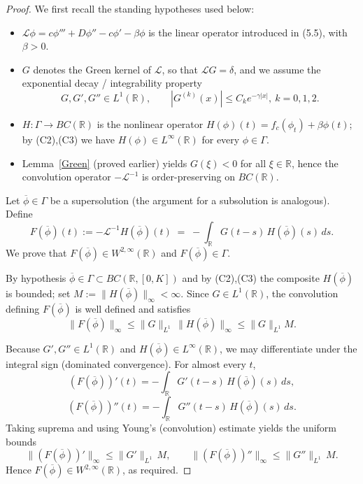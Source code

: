 \documentclass[12pt,letterpaper]{amsart}
\theoremstyle{definition}
\theoremstyle{remark}
\numberwithin{equation}{section}
\begin{document}
 \begin{proof}
 	We first recall the standing hypotheses used below:
 	\begin{itemize}
 		\item $\mathcal L\phi=c\phi''' + D\phi'' - c\phi' -\beta\phi$ is the linear operator introduced in (5.5), with $\beta>0$.
 		\item $G$ denotes the Green kernel of $\mathcal L$, so that $\mathcal L G=\delta$, and we assume the exponential decay / integrability property
 		$$G,G',G''\in L^1(\mathbb R),\qquad |G^{(k)}(x)|\le C_k e^{-\gamma|x|},\ k=0,1,2.$$
 		\item $H:\Gamma\to BC(\mathbb R)$ is the nonlinear operator $H(\phi)(t)=f_c(\phi_t)+\beta\phi(t)$; by (C2),(C3) we have $H(\phi)\in L^\infty(\mathbb R)$ for every $\phi\in\Gamma$.
 		\item Lemma~\ref{Green} (proved earlier) yields $G(\xi)<0$ for all $\xi\in\mathbb R$, hence the convolution operator $-\mathcal L^{-1}$ is order-preserving on $BC(\mathbb R)$.
 	\end{itemize}
 	
 	Let $\overline\phi\in\Gamma$ be a supersolution (the argument for a subsolution is analogous). Define
 	\[
 	F(\overline\phi)(t) := -\mathcal L^{-1}H(\overline\phi)(t) \;=\; -\int_{\mathbb R} G(t-s)\,H(\overline\phi)(s)\,ds.
 	\]
 	We prove that $F(\overline\phi)\in W^{2,\infty}(\mathbb R)$ and $F(\overline\phi)\in\Gamma$.
 	
 	By hypothesis $\overline\phi\in\Gamma\subset BC(\mathbb R,[0,K])$ and by (C2),(C3)
 	the composite $H(\overline\phi)$ is bounded; set $M:=\|H(\overline\phi)\|_\infty<\infty$.
 	Since $G\in L^1(\mathbb R)$, the convolution defining $F(\overline\phi)$ is well defined
 	and satisfies
 	\[
 	\|F(\overline\phi)\|_\infty \le \|G\|_{L^1}\,\|H(\overline\phi)\|_\infty \le \|G\|_{L^1} M.
 	\]
 	
 	Because $G',G''\in L^1(\mathbb R)$ and $H(\overline\phi)\in L^\infty(\mathbb R)$,
 	we may differentiate under the integral sign (dominated convergence). For almost every $t$,
 	\[
 	(F(\overline\phi))'(t) = -\int_{\mathbb R} G'(t-s)\,H(\overline\phi)(s)\,ds,
 	\]
 	\[
 	(F(\overline\phi))''(t) = -\int_{\mathbb R} G''(t-s)\,H(\overline\phi)(s)\,ds.
 	\]
 	Taking suprema and using Young's (convolution) estimate yields the uniform bounds
 	\[
 	\|(F(\overline\phi))'\|_\infty \le \|G'\|_{L^1}\,M,\qquad
 	\|(F(\overline\phi))''\|_\infty \le \|G''\|_{L^1}\,M.
 	\]
 	Hence $F(\overline\phi)\in W^{2,\infty}(\mathbb R)$, as required.
 	

\end{proof}
\end{document}
